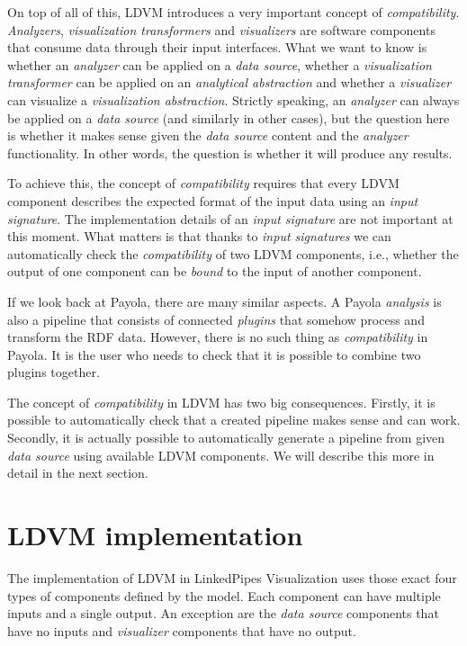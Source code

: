 On top of all of this, LDVM introduces a very important concept of \emph{compatibility}. \emph{Analyzers}, \emph{visualization transformers} and \emph{visualizers} are software components that consume data through their input interfaces. What we want to know is whether an \emph{analyzer} can be applied on a \emph{data source}, whether a \emph{visualization transformer} can be applied on an \emph{analytical abstraction} and whether a \emph{visualizer} can visualize a \emph{visualization abstraction}. Strictly speaking, an \emph{analyzer} can always be applied on a \emph{data source} (and similarly in other cases), but the question here is whether it makes sense given the \emph{data source} content and the \emph{analyzer} functionality. In other words, the question is whether it will produce any results.

To achieve this, the concept of \emph{compatibility} requires that every LDVM component describes the expected format of the input data using an \emph{input signature}. The implementation details of an \emph{input signature} are not important at this moment. What matters is that thanks to \emph{input signatures} we can automatically check the \emph{compatibility} of two LDVM components, i.e., whether the output of one component can be \emph{bound} to the input of another component.

If we look back at Payola, there are many similar aspects. A Payola \emph{analysis} is also a pipeline that consists of connected \emph{plugins} that somehow process and transform the RDF data. However, there is no such thing as \emph{compatibility} in Payola. It is the user who needs to check that it is possible to combine two plugins together.

The concept of \emph{compatibility} in LDVM has two big consequences. Firstly, it is possible to automatically check that a created pipeline makes sense and can work. Secondly, it is actually possible to automatically generate a pipeline from given \emph{data source} using available LDVM components. We will describe this more in detail in the next section.

\section{LDVM implementation}
\label{sec:linkedpipes:ldvm-implementation}

The implementation of LDVM in LinkedPipes Visualization \cite{ldvm_use_cases} uses those exact four types of components defined by the model. Each component can have multiple inputs and a single output. An exception are the \emph{data source} components that have no inputs and \emph{visualizer} components that have no output. 

